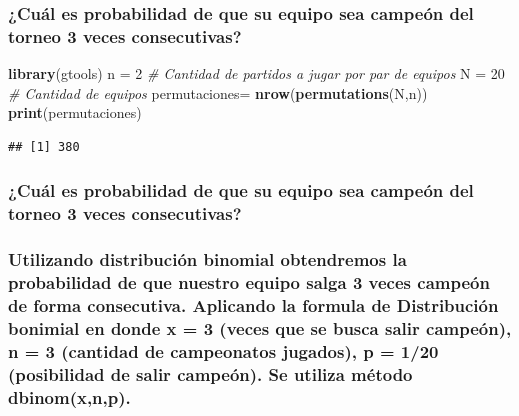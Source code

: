 \documentclass[]{article}
\newenvironment{Shaded}{\begin{snugshade}}{\end{snugshade}}
\newcommand{\CommentTok}[1]{\textcolor[rgb]{0.56,0.35,0.01}{\textit{#1}}}
\newcommand{\DecValTok}[1]{\textcolor[rgb]{0.00,0.00,0.81}{#1}}
\newcommand{\KeywordTok}[1]{\textcolor[rgb]{0.13,0.29,0.53}{\textbf{#1}}}
\newcommand{\NormalTok}[1]{#1}
\newcommand{\StringTok}[1]{\textcolor[rgb]{0.31,0.60,0.02}{#1}}
\begin{document}
\hypertarget{cual-es-probabilidad-de-que-su-equipo-sea-campeon-del-torneo-3-veces-consecutivas}{%
\subsubsection{¿Cuál es probabilidad de que su equipo sea campeón del
torneo 3 veces
consecutivas?}\label{cual-es-probabilidad-de-que-su-equipo-sea-campeon-del-torneo-3-veces-consecutivas}}

\begin{Shaded}
\begin{Highlighting}[]
\KeywordTok{library}\NormalTok{(gtools)}
\NormalTok{n =}\StringTok{ }\DecValTok{2} \CommentTok{# Cantidad de partidos a jugar por par de equipos}
\NormalTok{N =}\StringTok{ }\DecValTok{20} \CommentTok{# Cantidad de equipos}
\NormalTok{permutaciones=}\StringTok{ }\KeywordTok{nrow}\NormalTok{(}\KeywordTok{permutations}\NormalTok{(N,n))}
\KeywordTok{print}\NormalTok{(permutaciones)}
\end{Highlighting}
\end{Shaded}

\begin{verbatim}
## [1] 380
\end{verbatim}

\hypertarget{cual-es-probabilidad-de-que-su-equipo-sea-campeon-del-torneo-3-veces-consecutivas}{%
\subsubsection{¿Cuál es probabilidad de que su equipo sea campeón del
torneo 3 veces
consecutivas?}\label{cual-es-probabilidad-de-que-su-equipo-sea-campeon-del-torneo-3-veces-consecutivas}}

\hypertarget{utilizando-distribucion-binomial-obtendremos-la-probabilidad-de-que-nuestro-equipo-salga-3-veces-campeon-de-forma-consecutiva.-aplicando-la-formula-de-distribucion-bonimial-en-donde-x-3-veces-que-se-busca-salir-campeon-n-3-cantidad-de-campeonatos-jugados-p-120-posibilidad-de-salir-campeon.-se-utiliza-metodo-dbinomxnp.}{%
\subsubsection{Utilizando distribución binomial obtendremos la
probabilidad de que nuestro equipo salga 3 veces campeón de forma
consecutiva. Aplicando la formula de Distribución bonimial en donde x =
3 (veces que se busca salir campeón), n = 3 (cantidad de campeonatos
jugados), p = 1/20 (posibilidad de salir campeón). Se utiliza método
dbinom(x,n,p).}\label{utilizando-distribucion-binomial-obtendremos-la-probabilidad-de-que-nuestro-equipo-salga-3-veces-campeon-de-forma-consecutiva.-aplicando-la-formula-de-distribucion-bonimial-en-donde-x-3-veces-que-se-busca-salir-campeon-n-3-cantidad-de-campeonatos-jugados-p-120-posibilidad-de-salir-campeon.-se-utiliza-metodo-dbinomxnp.}}
\end{document}
